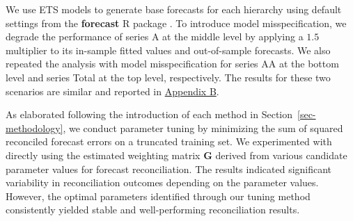 \documentclass[
  11pt]{article}
\theoremstyle{plain}
\theoremstyle{remark}
\begin{document}
We use ETS models to generate base forecasts for each hierarchy using
default settings from the \textbf{forecast} R package
\citep{Hyndman2023-fc}. To introduce model misspecification, we degrade
the performance of series A at the middle level by applying a \(1.5\)
multiplier to its in-sample fitted values and out-of-sample forecasts.
We also repeated the analysis with model misspecification for series AA
at the bottom level and series Total at the top level, respectively. The
results for these two scenarios are similar and reported in
\hyperref[appendix-sim1]{Appendix B}.

As elaborated following the introduction of each method in
Section~\ref{sec-methodology}, we conduct parameter tuning by minimizing
the sum of squared reconciled forecast errors on a truncated training
set. We experimented with directly using the estimated weighting matrix
\(\bm{G}\) derived from various candidate parameter values for forecast
reconciliation. The results indicated significant variability in
reconciliation outcomes depending on the parameter values. However, the
optimal parameters identified through our tuning method consistently
yielded stable and well-performing reconciliation results.
\end{document}
